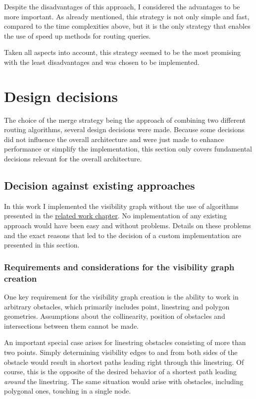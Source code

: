 		Despite the disadvantages of this approach, I considered the advantages to be more important.
		As already mentioned, this strategy is not only simple and fast, compared to the time complexities above, but it is the only strategy that enables the use of speed up methods for routing queries.
		
		Taken all aspects into account, this strategy seemed to be the most promising with the least disadvantages and was chosen to be implemented.

\section{Design decisions}
\label{sec:design-decisions}

	The choice of the merge strategy being the approach of combining two different routing algorithms, several design decisions were made.
	Because some decisions did not influence the overall architecture and were just made to enhance performance or simplify the implementation, this section only covers fundamental decisions relevant for the overall architecture.
	
	\subsection{Decision against existing approaches}
	\label{subsec:decision-against-existing-approaches}
	
		In this work I implemented the visibility graph without the use of algorithms presented in the \hyperref[chap:related-work]{related work chapter}.
		No implementation of any existing approach would have been easy and without problems.
		Details on these problems and the exact reasons that led to the decision of a custom implementation are presented in this section.
		
		\subsubsection{Requirements and considerations for the visibility graph creation}
		
			One key requirement for the visibility graph creation is the ability to work in arbitrary obstacles, which primarily includes point, linestring and polygon geometries.
			Assumptions about the collinearity, position of obstacles and intersections between them cannot be made.
			
			An important special case arises for linestring obstacles consisting of more than two points.
			Simply determining visibility edges to and from both sides of the obstacle would result in shortest paths leading right through this linestring.
			Of course, this is the opposite of the desired behavior of a shortest path leading \emph{around} the linestring.
			The same situation would arise with obstacles, including polygonal ones, touching in a single node.
			

